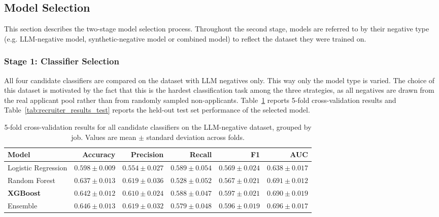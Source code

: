 \subsection{Model Selection}
This section describes the two-stage model selection process. Throughout the second stage, models are referred to by their negative type (e.g. LLM-negative model, synthetic-negative model or combined model) to reflect the dataset they were trained on. 

\subsubsection{Stage 1: Classifier Selection}
\label{sec:exp_recruiter_model_comparison}

All four candidate classifiers are compared on the dataset with \gls{LLM}
negatives only. This way only the model type is varied. The choice of this
dataset is motivated by the fact that this is the hardest classification task
among the three strategies, as all negatives are drawn from the real applicant
pool rather than from randomly sampled non-applicants.
Table~\ref{tab:recruiter_results_cv} reports 5-fold cross-validation results and Table~\ref{tab:recruiter_results_test} reports the held-out test set performance of the selected model.

\begin{table}[htbp]
    \centering
    \small
    \caption{5-fold cross-validation results for all candidate classifiers
    on the \gls{LLM}-negative dataset, grouped by job. Values are mean
    $\pm$ standard deviation across folds.}
    \label{tab:recruiter_results_cv}
    \begin{tabular}{lrrrrr}
        \toprule
        \textbf{Model} & \textbf{Accuracy} & \textbf{Precision}
            & \textbf{Recall} & \textbf{F1} & \textbf{AUC} \\
        \midrule
        Logistic Regression
            & $0.598 \pm 0.009$
            & $0.554 \pm 0.027$
            & $0.589 \pm 0.054$
            & $0.569 \pm 0.024$
            & $0.638 \pm 0.017$ \\
        Random Forest
            & $0.637 \pm 0.013$
            & $0.619 \pm 0.036$
            & $0.528 \pm 0.052$
            & $0.567 \pm 0.021$
            & $0.691 \pm 0.012$ \\
        \textbf{XGBoost}
            & $\mathbf{0.642 \pm 0.012}$
            & $0.610 \pm 0.024$
            & $0.588 \pm 0.047$
            & $\mathbf{0.597 \pm 0.021}$
            & $0.690 \pm 0.019$ \\
        Ensemble
            & $0.646 \pm 0.013$
            & $0.619 \pm 0.032$
            & $0.579 \pm 0.048$
            & $0.596 \pm 0.019$
            & $\mathbf{0.696 \pm 0.017}$ \\
        \bottomrule
    \end{tabular}
\end{table}

